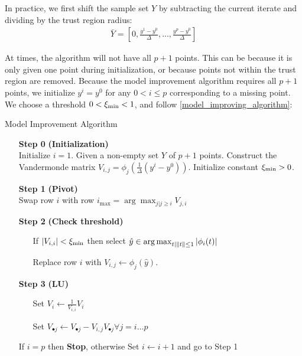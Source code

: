 In practice, we first shift the sample set $Y$ by subtracting the current iterate and dividing by the trust region radius:
\begin{align}
\bar{Y} = [0, \frac{y^1 - y^0}{\Delta}, \ldots, \frac{y^p - y^0}{\Delta}]
\end{align}

At times, the algorithm will not have all $p+1$ points.
This can be because it is only given one point during initialization, or because points not within the trust region are removed.
Because the model improvement algorithm requires all $p+1$ points, we initialize $y^i = y^0$ for any $0 < i \le p$ corresponding to a missing point.
We choose a threshold $0 < \xi_{\text{min}} < 1$, and follow \cref{model_improving_algorithm}:

\begin{algorithm}[H]
    \caption{Model Improvement Algorithm}
    \label{model_improving_algorithm}
    \begin{itemize}
        \item[\textbf{Step 0}] \textbf{(Initialization)} \\
            Initialize $i=1$.
            Given a non-empty set $Y$ of $p+1$ points. 
            Construct the Vandermonde matrix $V_{i,j} = \phi_j(\frac 1 {\Delta}(y^i - y^0))$.
			Initialize constant $\xi_{\text{min}} > 0$.
        \item[\textbf{Step 1}] \textbf{(Pivot)} \\
            Swap row $i$ with row $i_{\max} = \arg \max_{j|j\ge i} V_{j,i} $
        
        \item[\textbf{Step 2}] \textbf{(Check threshold)} \begin{itemize}
                \item[] If $|V_{i,i}| < \xi_{\text{min}}$ then select \label{next_point} $\hat y \in \operatorname*{arg\,max}_{t | \|t\|\le 1} |\phi_i(t)|$
                \item[] Replace row $i$ with $V_{i, j} \gets \phi_j(\hat y)$.
            \end{itemize}
        
        \item[\textbf{Step 3}] \textbf{(LU)} \begin{itemize}
                \item[] Set $V_i \gets \frac{1}{V_{i,i}} V_i$
                \item[] Set $V_{\bullet j} \gets V_{\bullet j} - V_{i,j} V_{\bullet j} \forall j=i \ldots p$
            \end{itemize}
            If $i = p$ then \textbf{Stop}, otherwise Set $i \gets i+1$ and go to Step 1
    \end{itemize}
\end{algorithm}


